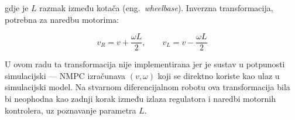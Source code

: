 gdje je $L$ razmak između kotača (eng.\ \textit{wheelbase}). Inverzna transformacija, potrebna za naredbu motorima:

\begin{equation}
  v_R = v + \frac{\omega L}{2}, \qquad v_L = v - \frac{\omega L}{2}
\end{equation}

U ovom radu ta transformacija nije implementirana jer je sustav u potpunosti simulacijski --- NMPC izračunava $(v, \omega)$ koji se direktno koriste kao ulaz u simulacijski model. Na stvarnom diferencijalnom robotu ova transformacija bila bi neophodna kao zadnji korak između izlaza regulatora i naredbi motornih kontrolera, uz poznavanje parametra $L$.
